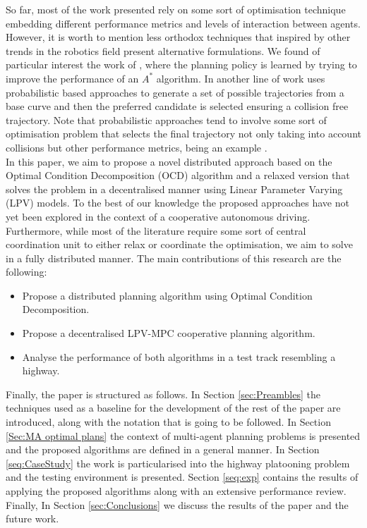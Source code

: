 \documentclass[a4paper,fleqn]{cas-sc}
\begin{document}
So far, most of the work presented rely on some sort of optimisation technique embedding different performance metrics and levels of interaction between agents. However, it is worth to mention less orthodox techniques that inspired by other trends in the robotics field present alternative formulations. We found of particular interest the work of \cite{Bae2019}, where the planning policy is learned by trying to improve the performance of an $A^*$ algorithm. In another line of work \cite{Wang2022} uses probabilistic based approaches to generate a set of possible trajectories from a base curve and then the preferred candidate is selected ensuring a collision free trajectory. Note that probabilistic approaches tend to involve some sort of optimisation problem that selects the final trajectory not only taking into account collisions but other performance metrics, being an example \cite{Heintzman2021}.\\

In this paper, we aim to propose a novel distributed approach based on the Optimal Condition Decomposition (OCD) algorithm and a relaxed version that solves the problem in a decentralised manner using Linear Parameter Varying (LPV) models. To the best of our knowledge the proposed approaches have not yet been explored in the context of a cooperative autonomous driving. Furthermore, while most of the literature require some sort of central coordination unit to either relax or coordinate the optimisation, we aim to solve in a fully distributed manner. The main contributions of this research are the following: 

\begin{itemize}
    \item Propose a distributed planning algorithm using Optimal Condition Decomposition.
    \item Propose a decentralised LPV-MPC cooperative planning algorithm. 
    \item Analyse the performance of both algorithms in a test track resembling a highway. 
\end{itemize}

Finally, the paper is structured as follows. In Section \ref{sec:Preambles} the techniques used as a baseline for the development of the rest of the paper are introduced, along with the notation that is going to be followed. In Section \ref{Sec:MA optimal plans} the context of multi-agent planning problems is presented and the proposed algorithms are defined in a general manner. In Section \ref{seq:CaseStudy} the work is particularised into the highway platooning problem and the testing environment is presented. Section \ref{seq:exp} contains the results of applying the proposed algorithms along with an extensive performance review. Finally, In Section \ref{sec:Conclusions} we discuss the results of the paper and the future work. 
\end{document}
